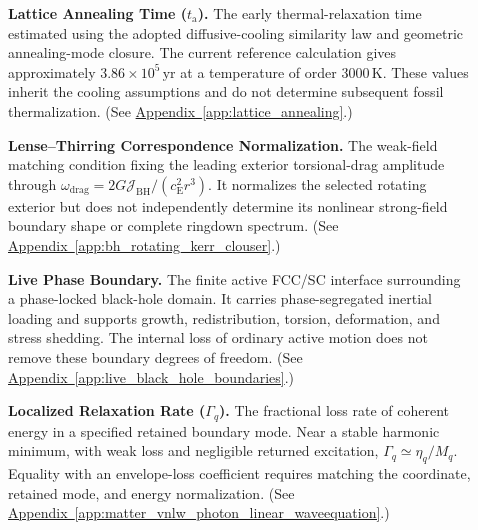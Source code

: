 \begin{description}
\item[] \begin{minipage}[t]{\linewidth}
\textbf{Lattice Annealing Time ($t_{\mathrm a}$).} The early thermal-relaxation time estimated using the adopted diffusive-cooling similarity law and geometric annealing-mode closure. The current reference calculation gives approximately $3.86\times10^5\,\mathrm{yr}$ at a temperature of order $3000\,\mathrm K$. These values inherit the cooling assumptions and do not determine subsequent fossil thermalization.
(See \hyperref[app:lattice_annealing]{Appendix~\ref*{app:lattice_annealing}}.)
\end{minipage}

\item[] \begin{minipage}[t]{\linewidth}
\textbf{Lense--Thirring Correspondence Normalization.} The weak-field matching condition fixing the leading exterior torsional-drag amplitude through $\omega_{\mathrm{drag}}=2G\mathcal J_{\mathrm{BH}}/(c_{\mathrm E}^2r^3)$. It normalizes the selected rotating exterior but does not independently determine its nonlinear strong-field boundary shape or complete ringdown spectrum.
(See \hyperref[app:bh_rotating_kerr_clouser]{Appendix~\ref*{app:bh_rotating_kerr_clouser}}.)
\end{minipage}

\item[] \begin{minipage}[t]{\linewidth}
\textbf{Live Phase Boundary.} The finite active FCC/SC interface surrounding a phase-locked black-hole domain. It carries phase-segregated inertial loading and supports growth, redistribution, torsion, deformation, and stress shedding. The internal loss of ordinary active motion does not remove these boundary degrees of freedom.
(See \hyperref[app:live_black_hole_boundaries]{Appendix~\ref*{app:live_black_hole_boundaries}}.)
\end{minipage}

\item[] \begin{minipage}[t]{\linewidth}
\textbf{Localized Relaxation Rate ($\Gamma_q$).} The fractional loss rate of coherent energy in a specified retained boundary mode. Near a stable harmonic minimum, with weak loss and negligible returned excitation, $\Gamma_q\simeq\eta_q/M_q$. Equality with an envelope-loss coefficient requires matching the coordinate, retained mode, and energy normalization.
(See \hyperref[app:matter_vnlw_photon_linear_waveequation]{Appendix~\ref*{app:matter_vnlw_photon_linear_waveequation}}.)
\end{minipage}


\end{description}
